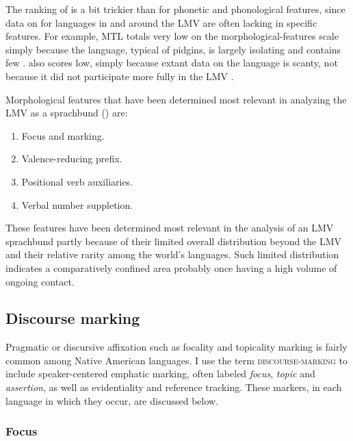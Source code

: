 \documentclass[output=paper]{LSP/langsci}
\begin{document}
The ranking of  is a bit trickier than for phonetic and phonological features, since data on  for languages in and around the LMV are often lacking in specific features. For example, MTL totals very low on the morphological-features scale simply because the language, typical of pidgins, is largely isolating and contains few .  also scores low, simply because extant data on the language is scanty, not because it did not participate more fully in the LMV .

	Morphological features that have been determined most relevant in analyzing the LMV as a sprachbund (\citealt[3]{Kaufman2014}) are:

\begin{enumerate}
\item{Focus and  marking.}
\item{Valence-reducing prefix.}
\item{Positional verb auxiliaries.}
\item{Verbal number suppletion.}
\end{enumerate}
 
These features have been determined most relevant in the analysis of an LMV sprachbund partly because of their limited overall distribution beyond the LMV and their relative rarity among the world’s languages. Such limited distribution indicates a comparatively confined area probably once having a high volume of ongoing contact.

\subsection{Discourse marking}

Pragmatic or discursive affixation such as focality and topicality marking is fairly common among Native American languages. I use the term \textsc{discourse-marking} to include speaker-centered emphatic marking, often labeled \emph{focus}, \emph{topic} and \emph{assertion}, as well as evidentiality and reference tracking. These markers, in each language in which they occur, are discussed below.

\subsubsection{Focus}
	
\end{document}
